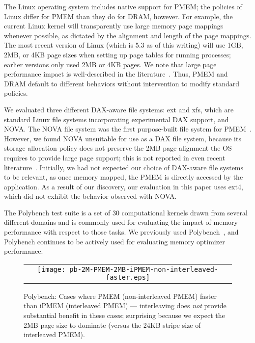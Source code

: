 The Linux operating system includes native support for PMEM; the policies of Linux differ for PMEM than they do for DRAM, however.  For example, the current Linux kernel will transparently use large memory page mappings whenever possible, as dictated by the alignment and length of the page mappings.  The most recent version of Linux (which is 5.3 as of this writing) will use 1GB, 2MB, or 4KB page sizes when setting up page tables for running processes; earlier versions only used 2MB or 4KB pages. We note that large page performance impact is well-described in the literature~\cite{agarwal2017thermostat,panwar2018making}.  Thus, PMEM and DRAM default to different behaviors without  intervention to modify standard policies.

We evaluated three different DAX-aware file systems: ext and xfs, which are standard Linux file systems incorporating experimental DAX support, and NOVA. The NOVA file system was the first purpose-built file system for PMEM~\cite{xu2016nova}.  However, we found NOVA unsuitable for use as a DAX file system, because its storage allocation policy does not preserve the 2MB page alignment the OS requires to provide large page support; this is not reported in even recent literature~\cite{izraelevitz2019basic,yang2019empirical}. Initially, we had not expected our choice of DAX-aware file systems to be relevant, as once memory mapped, the PMEM is directly accessed by the application.  As a result of our discovery, our evaluation in this paper uses ext4, which did not exhibit the behavior observed with NOVA.


The Polybench test suite is a set of 30 computational kernels drawn from several different domains and is commonly used for evaluating the impact of memory performance with respect to those tasks. We previously used Polybench~\cite{doudali2017comerge}, and Polybench continues to be actively used for evaluating memory optimizer performance.

\begin{figure}[!bh]
  \captionsetup{justification=centering}
  \centering
  \caption{Polybench: Cases where PMEM (non-interleaved PMEM) faster than iPMEM (interleaved PMEM) --- interleaving does \textit{not} provide substantial benefit in these cases; surprising because we expect the 2MB page size to dominate (versus the 24KB stripe size of interleaved PMEM).}
  \vspace{2mm}
  \label{fig:polybench:PMEM-vs-ipmem}
  \begin{tabular}{c}
    \texttt{[image: pb-2M-PMEM-2MB-iPMEM-non-interleaved-faster.eps]}
  \end{tabular}
\end{figure}



